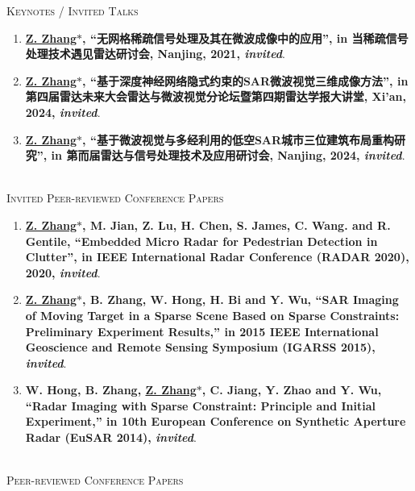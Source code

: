 \documentclass[paper=a4,fontsize=11pt]{scrartcl}
\begin{document}
\textsc{Keynotes / Invited Talks}

\begin{enumerate}

\item \textbf{\underline{Z. Zhang$\ast$}, ``无网格稀疏信号处理及其在微波成像中的应用'', in 当稀疏信号处理技术遇见雷达研讨会, Nanjing, 2021, \emph{invited}}.

\item \textbf{\underline{Z. Zhang$\ast$}, ``基于深度神经网络隐式约束的SAR微波视觉三维成像方法'', in 第四届雷达未来大会雷达与微波视觉分论坛暨第四期雷达学报大讲堂, Xi'an, 2024, \emph{invited}}.

\item \textbf{\underline{Z. Zhang$\ast$}, ``基于微波视觉与多经利用的低空SAR城市三位建筑布局重构研究'', in 第而届雷达与信号处理技术及应用研讨会, Nanjing, 2024, \emph{invited}}.

\end{enumerate}

~\\

\textsc{Invited Peer-reviewed Conference Papers}

\begin{enumerate}
	
\item \textbf{\underline{Z. Zhang$\ast$}, M. Jian, Z. Lu, H. Chen, S. James, C. Wang. and R. Gentile, ``Embedded Micro Radar for Pedestrian Detection in Clutter'', in IEEE International Radar Conference (RADAR 2020), 2020, \emph{invited}}.
   
\item \textbf{\underline{Z. Zhang$\ast$}, B. Zhang, W. Hong, H. Bi and Y. Wu, ``SAR Imaging of Moving Target in a Sparse Scene Based on Sparse Constraints: Preliminary Experiment Results,'' in 2015 IEEE International Geoscience and Remote Sensing Symposium (IGARSS 2015), \emph{invited}}.

\item \textbf{W. Hong, B. Zhang, \underline{Z. Zhang$\ast$}, C. Jiang, Y. Zhao and Y. Wu, ``Radar Imaging with Sparse Constraint: Principle and Initial Experiment,'' in 10th European Conference on Synthetic Aperture Radar (EuSAR 2014), \emph{invited}}.


\end{enumerate}

~\\

\textsc{Peer-reviewed Conference Papers}
\end{document}
